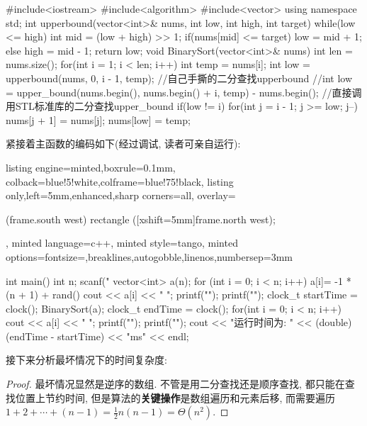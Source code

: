 \documentclass{article}
\begin{document}
\begin{homeworkProblem}
\begin{tcblisting}
#include<iostream>
#include<algorithm>
#include<vector>
using namespace std;
int upperbound(vector<int>& nums, int low, int high, int target) {
    while(low <= high) {
        int mid = (low + high) >> 1;
        if(nums[mid] <= target) {
            low = mid + 1;
        }
        else {
            high = mid - 1;
        }
    }
    return low;
}
void BinarySort(vector<int>& nums) {
    int len = nums.size();
    for(int i = 1; i < len; i++) {
        int temp = nums[i];
        int low = upperbound(nums, 0, i - 1, temp); //自己手撕的二分查找upperbound
        //int low = upper_bound(nums.begin(), nums.begin() + i, temp) - nums.begin(); //直接调用STL标准库的二分查找upper_bound
        if(low != i) {
            for(int j = i - 1; j >= low; j--) {
                nums[j + 1] = nums[j];
            }
            nums[low] = temp;
        }
    }
}
\end{tcblisting}
紧接着主函数的编码如下(经过调试, 读者可亲自运行):
\begin{tcblisting}{listing engine=minted,boxrule=0.1mm,
colback=blue!5!white,colframe=blue!75!black,
listing only,left=5mm,enhanced,sharp corners=all,
overlay={\begin{tcbclipinterior} (frame.south west)
rectangle ([xshift=5mm]frame.north west);\end{tcbclipinterior}},
minted language=c++,
minted style=tango,
minted options={fontsize=\small,breaklines,autogobble,linenos,numbersep=3mm}}
int main() 
{
    int n;
    scanf("%
    vector<int> a(n);
    for (int i = 0; i < n; i++) {
        a[i]= -1 * (n + 1) + rand()%
        cout << a[i] << " ";
    }
    printf("\n");
    printf("\n");
    clock_t startTime = clock();
    BinarySort(a);
    clock_t endTime = clock();
    for(int i = 0; i < n; i++) {
        cout << a[i] << " "; 
    }
    printf("\n");
    printf("\n");
    cout << "运行时间为: " << (double)(endTime - startTime) << "ms" << endl;
}
\end{tcblisting}
接下来分析最坏情况下的时间复杂度:
\begin{proof}
	最坏情况显然是逆序的数组. 不管是用二分查找还是顺序查找, 都只能在查找位置上节约时间, 但是算法的\textbf{关键操作}是数组遍历和元素后移, 而需要遍历$1+2+\cdots + (n-1)=\frac{1}{2}n(n-1)=\Theta(n^2)$.
\end{proof}
\end{homeworkProblem}
\end{document}
